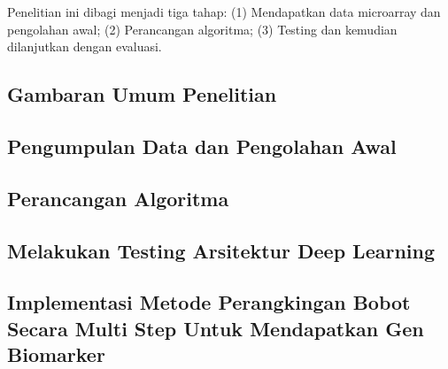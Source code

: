 \chapter{\babTiga}
Penelitian ini dibagi menjadi tiga tahap: (1) Mendapatkan data microarray dan pengolahan awal; (2) Perancangan algoritma; (3) Testing dan kemudian dilanjutkan dengan evaluasi.

\section{Gambaran Umum Penelitian}



\section{Pengumpulan Data dan Pengolahan Awal}




\section{Perancangan Algoritma}



\section{Melakukan Testing Arsitektur Deep Learning}


\section{Implementasi Metode Perangkingan Bobot Secara Multi Step Untuk Mendapatkan Gen Biomarker}




